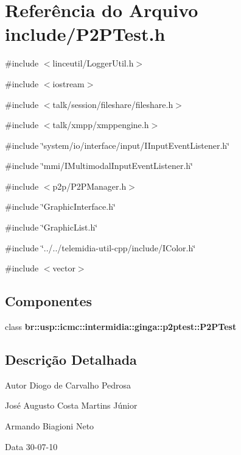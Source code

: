 \section{Referência do Arquivo include/P2PTest.h}
\label{P2PTest_8h}
{\ttfamily \#include $<$linceutil/LoggerUtil.h$>$}\par
{\ttfamily \#include $<$iostream$>$}\par
{\ttfamily \#include $<$talk/session/fileshare/fileshare.h$>$}\par
{\ttfamily \#include $<$talk/xmpp/xmppengine.h$>$}\par
{\ttfamily \#include \char`\"{}system/io/interface/input/IInputEventListener.h\char`\"{}}\par
{\ttfamily \#include \char`\"{}mmi/IMultimodalInputEventListener.h\char`\"{}}\par
{\ttfamily \#include $<$p2p/P2PManager.h$>$}\par
{\ttfamily \#include \char`\"{}GraphicInterface.h\char`\"{}}\par
{\ttfamily \#include \char`\"{}GraphicList.h\char`\"{}}\par
{\ttfamily \#include \char`\"{}../../telemidia-\/util-\/cpp/include/IColor.h\char`\"{}}\par
{\ttfamily \#include $<$vector$>$}\par
\subsection*{Componentes}
\begin{DoxyCompactItemize}
\item 
class {\bf br::usp::icmc::intermidia::ginga::p2ptest::P2PTest}
\end{DoxyCompactItemize}


\subsection{Descrição Detalhada}
\begin{DoxyAuthor}{Autor}
Diogo de Carvalho Pedrosa 

José Augusto Costa Martins Júnior 

Armando Biagioni Neto 
\end{DoxyAuthor}
\begin{DoxyDate}{Data}
30-\/07-\/10 
\end{DoxyDate}
